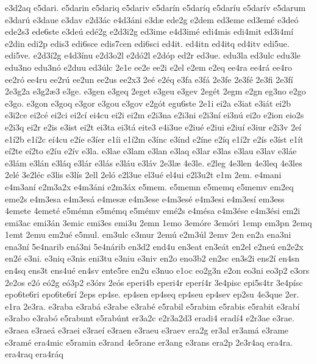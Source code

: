 {e3d2aq
e5dari.
e5darin
e5dariq
e5dariv
e5dar^^edn
e5dar^^edq
e5dar^^edu
e5dar^^edv
e5darum
e3dar^^fa
e3daue
e3dav
e2d3^^e1c
e4d3^^e1ni
e3d^^e6
ede2g
e2dem
ed3eme
ed3em^^e9
e3de^^f3
ede2s3
ede6ste
e3de^^fa
ed^^e92g
e2d3i2g
ed3ime
e4d3im^^e9
edi4mis
edi4mit
ed3i4m^^ed
e2din
edi2p
edis3
edi6sce
edis7cen
edi6sci
ed4it.
ed4itn
ed4itq
ed4itv
edi5ue.
edi5ve.
e2d3^^ed2g
e4d3^^ednu
e2d3o2l
e2d^^f32l
e2d^^f3p
ed2r
ed3ue.
edu3la
ed3ulc
edu3le
edu3no
edu3n^^f3
e2duu
ed3^^falc
2e1e
ee2e
ee2i
e2el
e2em
e2eq
ee4ra
ee4r^^e1
ee4ro
ee2r^^f3
ee4ru
ee2r^^fa
ee2un
ee2us
ee2x3
2e^^e9
e2^^e9q
e3fa
e3f^^e1
2e3fe
2e3f^^e9
2e3fi
2e3f^^ed
2e3g2a
e3g2^^e63
e3ge.
e3gen
e3geq
2eget
e3geu
e3gev
2eg^^e9t
2egm
e2gn
eg3no
e2go
e3go.
e3gon
e3goq
e3gor
e3gou
e3gov
e2g^^f3t
egu6ste
2e1i
ei2a
e3iat
e3i^^e1t
ei2b
e3i2ce
ei2c^^e9
ei2ci
ei2c^^ed
ei4cu
ei2i
ei2m
e2i3na
e2i3ni
e2i3n^^ed
ei3n^^fa
ei2o
e2ion
eio2s
e2i3q
ei2r
e2is
e3ist
ei2t
ei3ta
ei3t^^e1
eite3
e4i3ue
e2iu^^e9
e2iui
e2iu^^ed
e3iur
e2i3v
2e^^ed
e1^^ed2b
e1^^ed2c
e^^ed4cu
e2^^ede
e3^^eder
e1^^edi
e1^^ed2m
e3^^ednc
e3^^ednd
e2^^edne
e2^^edq
e1^^ed2r
e2^^eds
e3^^edst
e1^^edt
e^^ed2te
e^^ed2to
e2^^edu
e2^^edv
e3la.
e3lae
e3lam
e3lan
e3laq
e3lar
e3las
e3lau
e3lav
e3l^^e1e
e3l^^e1m
e3l^^e1n
e3l^^e1q
e3l^^e1r
e3l^^e1s
e3l^^e1u
e3l^^e1v
2e3l^^e6
4e3le.
e2leg
4e3len
4e3leq
4e3les
2el^^e9
3e2l^^e9c
e3lis
e3l^^eds
2ell
2el^^f3
e2l3ue
el3u^^e9
el4ui
e2l3u2t
e1m
2em.
e4mani
e4m3an^^ed
e2m3a2x
e4m3^^e1ni
e2m3^^e1x
e5mem.
e5memn
e5memq
e5memv
em2eq
eme2s
e4m3esa
e4m3es^^e1
e4mes^^e6
e4m3ese
e4m3es^^e9
e4m3esi
e4m3es^^ed
em3ess
4emete
4emet^^e9
e5m^^e9mn
e5m^^e9mq
e5m^^e9mv
em^^e92s
e4m^^e9sa
e4m3^^e9se
e4m3^^e9si
em2i
emi3ac
emi3^^e1n
3emic
emi3es
emi3u
2emn
1emo
3em^^f3re
3em^^f3ri
1emp
em3pn
2emq
1emt
2emu
em2u^^e9
e5mul.
em3ulc
e3mur
2em^^fa
e2m3^^fal
2emv
2en
en2a
ena3ni
ena3n^^ed
5e4narib
en^^e13ni
5e4n^^e1rib
en3d2
end4u
en3eat
en3e^^e1t
en2el
e2ne^^fa
en2e2x
en2^^e9
e3ni.
e3niq
e3nis
eni3tu
e3niu
e3niv
en2o
eno3b2
en2sc
en3s2i
ens2^^ed
en4sn
en4sq
ens3t
ens4u^^e9
en4sv
ente5re
en2u
e3nuo
e1oc
eo2g3n
e2on
eo3ni
eo3p2
e3ors
2e2os
e2^^f3
e^^f32g
e^^f33p2
e3^^f3rs
2e^^f3s
eperi4b
eperi4r
eper^^ed4r
3e4pisc
epi5s4tr
3e4p^^edsc
epo6te6ri
epo6te6r^^ed
2eps
ep4se.
ep4sen
ep4seq
ep4seu
ep4sev
ep2su
4e3que
2er.
e1ra
2e3ra.
e3raba
e3rab^^e1
e3rabe
e3rab^^e9
e5rabil
e5rabim
e5rabis
e5rabit
e3rab^^ed
e3rabo
e3rab^^f3
e5rabunt
e5rab^^fant
er3a2c
e2r3a2d3
eradi4
erad^^ed4
e2r3ae
e3rae.
e3raea
e3rae^^e1
e3raei
e3rae^^ed
e3raen
e3raeu
e3raev
era2g
er3al
er3am^^e1
e3rame
e3ram^^e9
era4mic
e5ramin
e3rand
4e5rane
er3ang
e3rans
era2p
2e3r4aq
era4ra.
era4raq
era4r^^e1q
}
